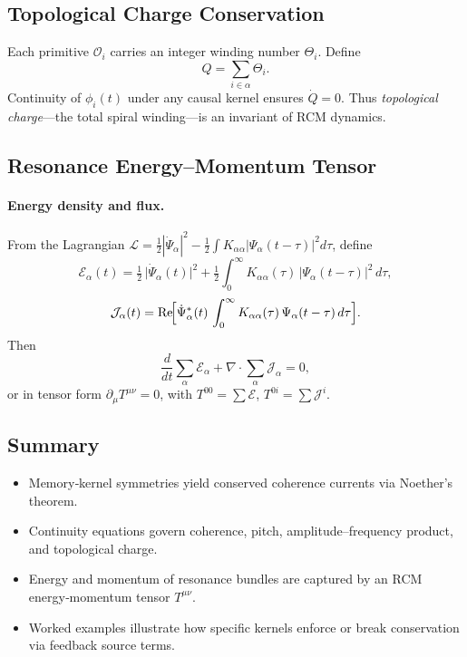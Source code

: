 \subsection{Topological Charge Conservation}

Each primitive \(\mathcal O_i\) carries an integer winding number \(\Theta_i\).  Define
\[
  Q = \sum_{i\in\alpha}\Theta_i.
\]
Continuity of \(\phi_i(t)\) under any causal kernel ensures \(\dot Q=0\).  Thus
\emph{topological charge}—the total spiral winding—is an invariant of RCM dynamics.

\subsection{Resonance Energy–Momentum Tensor}

\paragraph{Energy density and flux.}  
From the Lagrangian
\(\mathcal L = \frac12|\dot\Psi_{\alpha}|^{2}
  - \frac12\int K_{\alpha\alpha}|\Psi_{\alpha}(t-\tau)|^{2}d\tau\),
define
\[
  \mathcal E_{\alpha}(t)
  = \tfrac12\,\bigl|\dot\Psi_{\alpha}(t)\bigr|^{2}
    + \tfrac12\!\int_{0}^{\infty}
      K_{\alpha\alpha}(\tau)\,\bigl|\Psi_{\alpha}(t-\tau)\bigr|^{2}
    \,d\tau,
\]
\[
  \mathcal J_{\alpha}(t)
  = \Re\!\Bigl[\dot\Psi_{\alpha}^{*}(t)\,
    \int_{0}^{\infty}K_{\alpha\alpha}(\tau)\,\Psi_{\alpha}(t-\tau)\,d\tau\Bigr].
\]
Then
\[
  \frac{d}{dt}\sum_{\alpha}\mathcal E_{\alpha}
  + \nabla\!\cdot \sum_{\alpha}\mathcal J_{\alpha}
  = 0,
\]
or in tensor form \(\partial_{\mu}T^{\mu\nu}=0\), with
\(T^{00}=\sum\mathcal E\), \(T^{0i}=\sum\mathcal J^{i}\).

\subsection*{Summary}

\begin{itemize}
  \item Memory‐kernel symmetries yield conserved coherence currents via Noether’s theorem.
  \item Continuity equations govern coherence, pitch, amplitude–frequency product, and topological charge.
  \item Energy and momentum of resonance bundles are captured by an RCM energy‐momentum tensor \(T^{\mu\nu}\).
  \item Worked examples illustrate how specific kernels enforce or break conservation via feedback source terms.
\end{itemize}

